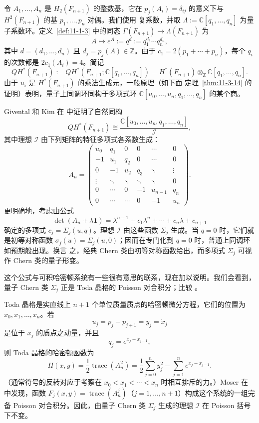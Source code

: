 令 $A_1,\ldots,A_n$ 是 $H_2(F_{n+1})$ 的整数基，它在
$p_j(A_i)=\delta_{ij}$ 的意义下与 $H^2(F_{n+1})$ 的基 $p_1,\ldots,p_n$ 对偶。我们使用
复系数，并取 $\Lambda:=\mathbb C[q_1,\ldots,q_n]$ 为量子系数环。定义~\ref{def:11-1-3}
中的同态 $\Gamma(F_{n+1})\to\Lambda(F_{n+1})$ 为
\[
  A\longmapsto e^A:=q^d:=q_1^{d_1}\cdots q_n^{d_n},
\]
其中 $d=(d_1,\ldots,d_n)$ 且 $d_j=p_j(A)\in\mathbb Z$。由于
$c_1=2(p_1+\cdots+p_n)$，每个 $q_i$ 的次数都是 $2c_1(A_i)=4$。简记
\[
  QH^*(F_{n+1}):=
  QH^*(F_{n+1};\mathbb C[q_1,\ldots,q_n])
  =H^*(F_{n+1})\otimes_{\mathbb Z}\mathbb C[q_1,\ldots,q_n].
\]
由于 $u_i$ 是 $H^*(F_{n+1})$ 的乘法生成元，一般原理（如下面
定理~\ref{thm:11-3-14} 的证明）表明，量子上同调环同构于多项式环
$\mathbb C[u_0,\ldots,u_n,q_1,\ldots,q_n]$ 的某个商。

Givental 和 Kim 在  中证明了自然同构
\[
  QH^*(F_{n+1})\cong
  \frac{\mathbb C[u_0,\ldots,u_n,q_1,\ldots,q_n]}{\mathcal I},
\]
其中理想 $\mathcal I$ 由下列矩阵的特征多项式各系数生成：
\[
  A_n=
  \begin{pmatrix}
    u_0&q_1&0&0&\cdots&0\\
    -1&u_1&q_2&0&\cdots&0\\
    0&-1&u_2&q_3&\ddots&\vdots\\
    \vdots&\ddots&\ddots&\ddots&\ddots&0\\
    0&\cdots&0&-1&u_{n-1}&q_n\\
    0&\cdots&\cdots&0&-1&u_n
  \end{pmatrix}.
\]
更明确地，考虑由公式
\[
  \det(A_n+\lambda\mathbf 1)
  =\lambda^{n+1}+c_1\lambda^n+\cdots+c_n\lambda+c_{n+1}
\]
确定的多项式 $c_j=\Sigma_j(u,q)$。理想 $\mathcal I$ 由这些函数 $\Sigma_j$ 生成。当
$q=0$ 时，它们就是初等对称函数
$\sigma_j(u)=\Sigma_j(u,0)$；因而在专门化到 $q=0$ 时，普通上同调环如预期般出现。换言
之，经典 Chern 类由初等对称函数给出，而多项式 $\Sigma_j$ 可视作 Chern 类的量子形变。

这个公式与可积哈密顿系统有一些很有意思的联系，现在加以说明。我们会看到，量子 Chern
类 $\Sigma_j$ 正是 Toda 晶格的 Poisson 对合积分；比较 。

Toda 晶格是实直线上 $n+1$ 个单位质量质点的哈密顿微分方程，它们的位置为
$x_0,x_1,\ldots,x_n$。若
\[
  u_j=p_j-p_{j+1}=y_j=\dot x_j
\]
是位于 $x_j$ 的质点之动量，并且
\[
  q_j=e^{x_j-x_{j-1}},
\]
则 Toda 晶格的哈密顿函数为
\[
  H(x,y)=\frac12\operatorname{trace}(A_n^2)
  =\frac12\sum_{j=0}^ny_j^2-\sum_{j=1}^ne^{x_j-x_{j-1}}.
\]
（通常符号的反转对应于考察在 $x_0<x_1<\cdots<x_n$ 时相互排斥的力。）Moser 在
 中发现，函数
$F_j(x,y)=\operatorname{trace}(A_n^j)$（$j=1,\ldots,n+1$）构成这个系统的一组完备
Poisson 对合积分。因此，由量子 Chern 类 $\Sigma_j$ 生成的理想 $\mathcal I$ 在 Poisson
括号下不变。

